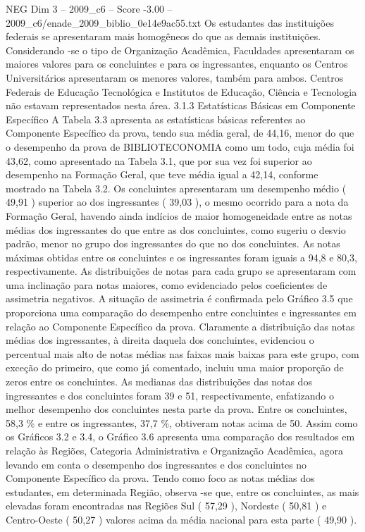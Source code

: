 \begin{textsample}{NEG Dim 3 – 2009\_c6 – Score -3.00 – 2009\_c6/enade\_2009\_biblio\_0e14e9ac55.txt}
Os estudantes das instituições federais se apresentaram mais homogêneos do que as demais instituições.
Considerando -se o tipo de Organização Acadêmica, Faculdades apresentaram os maiores valores para os concluintes e para os ingressantes, enquanto os Centros Universitários apresentaram os menores valores, também para ambos.
Centros Federais de Educação Tecnológica e Institutos de Educação, Ciência e Tecnologia não estavam representados nesta área. 3.1.3 Estatísticas Básicas em Componente Específico A Tabela 3.3 apresenta as estatísticas básicas referentes ao Componente Específico da prova, tendo sua média geral, de 44,16, menor do que o desempenho da prova de BIBLIOTECONOMIA como um todo, cuja média foi 43,62, como apresentado na Tabela 3.1, que por sua vez foi superior ao desempenho na Formação Geral, que teve média igual a 42,14, conforme mostrado na Tabela 3.2.
Os concluintes apresentaram um desempenho médio ( 49,91 ) superior ao dos ingressantes ( 39,03 ), o mesmo ocorrido para a nota da Formação Geral, havendo ainda indícios de maior homogeneidade entre as notas médias dos ingressantes do que entre as dos concluintes, como sugeriu o desvio padrão, menor no grupo dos ingressantes do que no dos concluintes.
As notas máximas obtidas entre os concluintes e os ingressantes foram iguais a 94,8 e 80,3, respectivamente.
As distribuições de notas para cada grupo se apresentaram com uma inclinação para notas maiores, como evidenciado pelos coeficientes de assimetria negativos.
A situação de assimetria é confirmada pelo Gráfico 3.5 que proporciona uma comparação do desempenho entre concluintes e ingressantes em relação ao Componente Específico da prova.
Claramente a distribuição das notas médias dos ingressantes, à direita daquela dos concluintes, evidenciou o percentual mais alto de notas médias nas faixas mais baixas para este grupo, com exceção do primeiro, que como já comentado, incluiu uma maior proporção de zeros entre os concluintes.
As medianas das distribuições das notas dos ingressantes e dos concluintes foram 39 e 51, respectivamente, enfatizando o melhor desempenho dos concluintes nesta parte da prova.
Entre os concluintes, 58,3 \% e entre os ingressantes, 37,7 \%, obtiveram notas acima de 50.
Assim como os Gráficos 3.2 e 3.4, o Gráfico 3.6 apresenta uma comparação dos resultados em relação às Regiões, Categoria Administrativa e Organização Acadêmica, agora levando em conta o desempenho dos ingressantes e dos concluintes no Componente Específico da prova.
Tendo como foco as notas médias dos estudantes, em determinada Região, observa -se que, entre os concluintes, as mais elevadas foram encontradas nas Regiões Sul ( 57,29 ), Nordeste ( 50,81 ) e Centro-Oeste ( 50,27 ) valores acima da média nacional para esta parte ( 49,90 ).

\end{textsample}
